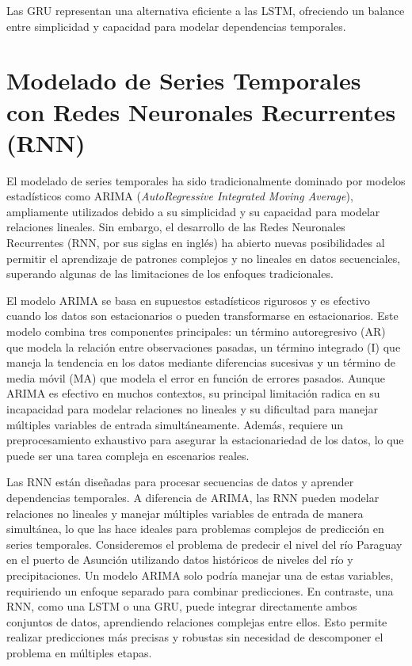 Las GRU representan una alternativa eficiente a las LSTM, ofreciendo un balance entre simplicidad y capacidad para modelar dependencias temporales.

\section{Modelado de Series Temporales con Redes Neuronales Recurrentes (RNN)}

El modelado de series temporales ha sido tradicionalmente dominado por modelos estadísticos como ARIMA (\textit{AutoRegressive Integrated Moving Average}), ampliamente utilizados debido a su simplicidad y su capacidad para modelar relaciones lineales. Sin embargo, el desarrollo de las Redes Neuronales Recurrentes (RNN, por sus siglas en inglés) ha abierto nuevas posibilidades al permitir el aprendizaje de patrones complejos y no lineales en datos secuenciales, superando algunas de las limitaciones de los enfoques tradicionales.

El modelo ARIMA se basa en supuestos estadísticos rigurosos y es efectivo cuando los datos son estacionarios o pueden transformarse en estacionarios. Este modelo combina tres componentes principales: un término autoregresivo (AR) que modela la relación entre observaciones pasadas, un término integrado (I) que maneja la tendencia en los datos mediante diferencias sucesivas y un término de media móvil (MA) que modela el error en función de errores pasados. Aunque ARIMA es efectivo en muchos contextos, su principal limitación radica en su incapacidad para modelar relaciones no lineales y su dificultad para manejar múltiples variables de entrada simultáneamente. Además, requiere un preprocesamiento exhaustivo para asegurar la estacionariedad de los datos, lo que puede ser una tarea compleja en escenarios reales.

Las RNN están diseñadas para procesar secuencias de datos y aprender dependencias temporales. A diferencia de ARIMA, las RNN pueden modelar relaciones no lineales y manejar múltiples variables de entrada de manera simultánea, lo que las hace ideales para problemas complejos de predicción en series temporales. Consideremos el problema de predecir el nivel del río Paraguay en el puerto de Asunción utilizando datos históricos de niveles del río y precipitaciones. Un modelo ARIMA solo podría manejar una de estas variables, requiriendo un enfoque separado para combinar predicciones. En contraste, una RNN, como una LSTM o una GRU, puede integrar directamente ambos conjuntos de datos, aprendiendo relaciones complejas entre ellos. Esto permite realizar predicciones más precisas y robustas sin necesidad de descomponer el problema en múltiples etapas.

